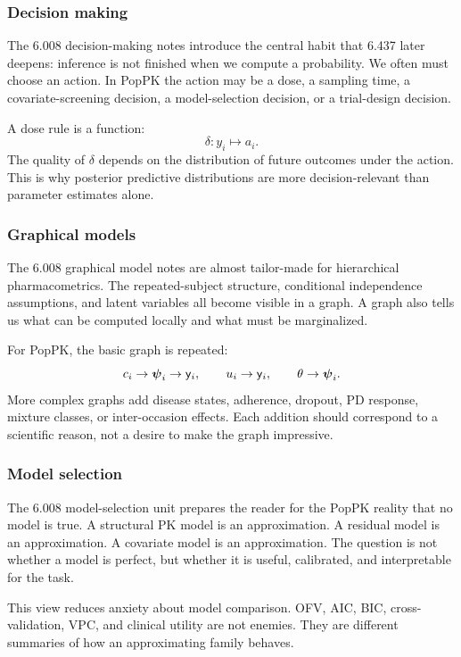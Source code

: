 \subsubsection*{Decision making}

The 6.008 decision-making notes introduce the central habit that 6.437 later deepens: inference is not finished when we compute a probability.  We often must choose an action.  In PopPK the action may be a dose, a sampling time, a covariate-screening decision, a model-selection decision, or a trial-design decision.

A dose rule is a function:
\[
  \delta: y_i \mapsto a_i.
\]
The quality of \(\delta\) depends on the distribution of future outcomes under the action.  This is why posterior predictive distributions are more decision-relevant than parameter estimates alone.

\subsubsection*{Graphical models}

The 6.008 graphical model notes are almost tailor-made for hierarchical pharmacometrics.  The repeated-subject structure, conditional independence assumptions, and latent variables all become visible in a graph.  A graph also tells us what can be computed locally and what must be marginalized.

For PopPK, the basic graph is repeated:
\[
  c_i\to\boldsymbol{\psi}_i\to\mathsf{y}_i,
  \qquad
  u_i\to\mathsf{y}_i,
  \qquad
  \theta\to\boldsymbol{\psi}_i.
\]
More complex graphs add disease states, adherence, dropout, PD response, mixture classes, or inter-occasion effects.  Each addition should correspond to a scientific reason, not a desire to make the graph impressive.

\subsubsection*{Model selection}

The 6.008 model-selection unit prepares the reader for the PopPK reality that no model is true.  A structural PK model is an approximation.  A residual model is an approximation.  A covariate model is an approximation.  The question is not whether a model is perfect, but whether it is useful, calibrated, and interpretable for the task.

This view reduces anxiety about model comparison.  OFV, AIC, BIC, cross-validation, VPC, and clinical utility are not enemies.  They are different summaries of how an approximating family behaves.

